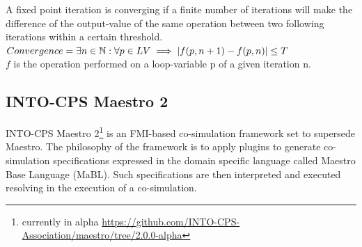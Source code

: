 \begin{definition}\label{def:convergence}
A fixed point iteration is converging if a finite number of iterations will make the difference of the output-value of the same operation between two following iterations within a certain threshold.\\
$Convergence = \exists n \in \mathbb{N}: \forall p \in LV \implies |f(p, n + 1) - f(p, n)| \leq T$\\
$f$ is the operation performed on a loop-variable p of a given iteration n.
\end{definition}


\subsection{INTO-CPS Maestro 2}
INTO-CPS Maestro 2\footnote{currently in alpha \url{https://github.com/INTO-CPS-Association/maestro/tree/2.0.0-alpha}}\cite{thule_maestro2_2019} is an FMI-based co-simulation framework set to supersede Maestro\cite{Maestro}. The philosophy of the framework is to apply plugins to generate co-simulation specifications expressed in the domain specific language called Maestro Base Language (MaBL). Such specifications are then interpreted and executed resolving in the execution of a co-simulation.
